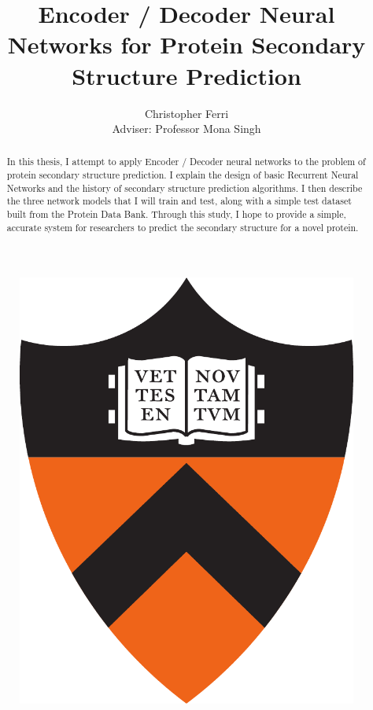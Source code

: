\documentclass[pageno]{jpaper}
\begin{document}
\title{Encoder / Decoder Neural Networks for Protein Secondary Structure Prediction}

\author{Christopher Ferri\\Adviser: Professor Mona Singh}

\date{}
\maketitle
\thispagestyle{empty}
\begin{abstract}
In this thesis, I attempt to apply Encoder / Decoder neural networks to the problem of protein secondary structure prediction.  I explain the design of basic Recurrent Neural Networks and the history of secondary structure prediction algorithms.  I then describe the three network models that I will train and test, along with a simple test dataset built from the Protein Data Bank.  Through this study, I hope to provide a simple, accurate system for researchers to predict the secondary structure for a novel protein.
\end{abstract}

\begin{figure}
	\centering
	\includegraphics[scale=0.75]{ShieldColor.pdf}
\end{figure}
\end{document}
